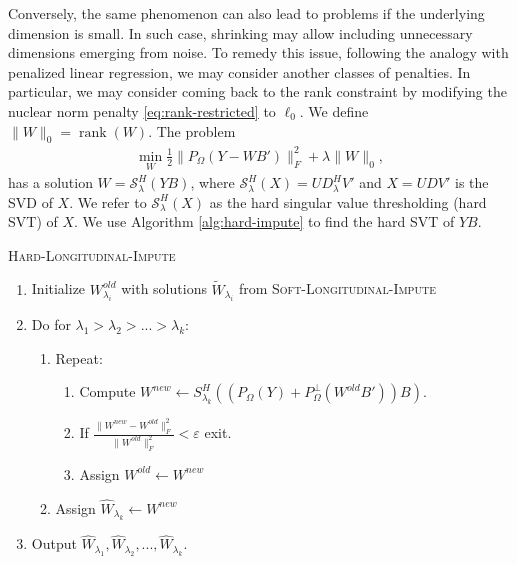 \documentclass[preprint]{imsart}
\numberwithin{equation}{section}
\theoremstyle{plain}
\newcommand{\cS}{\mathcal{S}}
\DeclareMathOperator*{\rank}{rank}
\begin{document}

Conversely, the same phenomenon can also lead to problems if the underlying dimension is small. In such case, shrinking may allow including unnecessary dimensions emerging from noise. To remedy this issue, following the analogy with penalized linear regression, we may consider another classes of penalties. In particular, we may consider coming back to the rank constraint by modifying the nuclear norm penalty \eqref{eq:rank-restricted} to $\ell_0$. We define $\|W\|_0 = \rank(W)$. The problem
\begin{align}\label{eq:matrixproblem-final-l0}
\min_{W} \frac{1}{2} \|P_\Omega(Y - WB')\|_F^2 + \lambda\|W\|_0,
\end{align}
has a solution $W = \cS_\lambda^H (YB)$, where $\cS_\lambda^H(X) = UD_\lambda^H V'$ and $X = UDV'$ is the SVD of $X$. We refer to $\cS_\lambda^H(X)$ as the hard singular value thresholding (hard SVT) of $X$. We use Algorithm \ref{alg:hard-impute} to find the hard SVT of $YB$.



\begin{algorithm}
\caption{\textsc{Hard-Longitudinal-Impute}\label{alg:hard-impute}}
\begin{enumerate}
\item Initialize $W^{old}_{\lambda_i}$ with solutions $\tilde{W}_{\lambda_i}$ from \textsc{Soft-Longitudinal-Impute}
\item Do for $\lambda_1 > \lambda_2 > ... > \lambda_k$:
\begin{enumerate}
\item Repeat:
\begin{enumerate}
\item Compute $W^{new} \leftarrow S_{\lambda_k}^H( (P_\Omega(Y) + P_\Omega^\perp(W^{old}B'))B )$.
\item If $\frac{\|W^{new} - W^{old}\|_F^2}{\|W^{old}\|_F^2} < \varepsilon$ exit.
\item Assign $W^{old} \leftarrow W^{new}$
\end{enumerate}
\item Assign $\hat{W}_{\lambda_k} \leftarrow W^{new}$
\end{enumerate}
\item Output $\hat{W}_{\lambda_1}, \hat{W}_{\lambda_2}, ... , \hat{W}_{\lambda_k}$.
\end{enumerate}
\end{algorithm}
\end{document}
